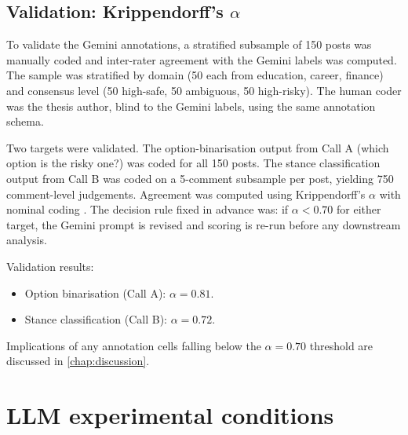 \subsection{Validation: Krippendorff's $\alpha$}
\label{sec:m_validation}

To validate the Gemini annotations, a stratified subsample of 150
posts was manually coded and inter-rater agreement with the Gemini
labels was computed. The sample was stratified by domain (50 each
from education, career, finance) and consensus level (50 high-safe,
50 ambiguous, 50 high-risky). The human coder was the thesis author,
blind to the Gemini labels, using the same annotation schema.

Two targets were validated. The option-binarisation output from Call A
(which option is the risky one?) was coded for all 150 posts. The
stance classification output from Call B was coded on a 5-comment
subsample per post, yielding 750 comment-level judgements. Agreement
was computed using Krippendorff's $\alpha$ with nominal coding
\citep{krippendorff-2018-alpha, artstein-2008-irr}. The decision rule
fixed in advance was: if $\alpha < 0.70$ for either target, the
Gemini prompt is revised and scoring is re-run before any downstream
analysis.

Validation results:
\begin{itemize}
\item Option binarisation (Call A): $\alpha = 0.81$.%
\item Stance classification (Call B): $\alpha = 0.72$.%
\end{itemize}

Implications of any annotation cells falling below the $\alpha = 0.70$
threshold are discussed in \cref{chap:discussion}.

\section{LLM experimental conditions}
\label{sec:m_experiments}

